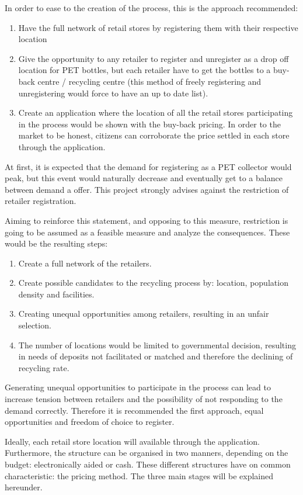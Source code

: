 \documentclass[twoside,a4paper,12pt]{report}
\begin{document}
In order to ease to the creation of the process, this is the approach recommended:
\begin{enumerate}
    \item Have the full network of retail stores by registering them with their respective location
    \item Give the opportunity to any retailer to register and unregister as a drop off location for PET bottles, but each retailer have to get the bottles to a buy-back centre / recycling centre (this method of freely registering and unregistering would force to have an up to date list).
    \item Create an application where the location of all the retail stores participating in the process would be shown with the buy-back pricing. In order to the market to be honest, citizens can corroborate the price settled in each store through the application.
\end{enumerate}

At first, it is expected that the demand for registering as a PET collector would peak, but this event would naturally decrease and eventually get to a balance between demand a offer. This project strongly advises against the restriction of retailer registration.

Aiming to reinforce this statement, and opposing to this measure, restriction is going to be assumed as a feasible measure and analyze the consequences. These would be the resulting steps:
\begin{enumerate}
    \item Create a full network of the retailers.
    \item Create possible candidates to the recycling process by: location, population density and facilities.
    \item Creating unequal opportunities among retailers, resulting in an unfair selection.
    \item The number of locations would be limited to governmental decision, resulting in needs of deposits not facilitated or matched and therefore the declining of recycling rate.
\end{enumerate}

Generating unequal opportunities to participate in the process can lead to increase tension between retailers and the possibility of not responding to the demand correctly. Therefore it is recommended the first approach, equal opportunities and freedom of choice to register. 

Ideally, each retail store location will available through the application. Furthermore, the structure can be organised in two manners, depending on the budget: electronically aided or cash. These different structures have on common characteristic: the pricing method. The three main stages will be explained hereunder.
\end{document}
